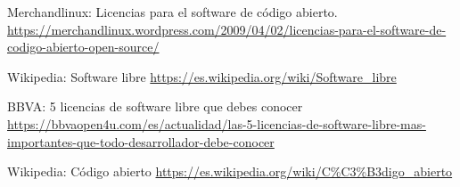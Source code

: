 \documentclass[10pt]{article}
\begin{document}
\begin{thebibliography}{9}
{}

        Merchandlinux: Licencias para el software de código abierto.
\url{https://merchandlinux.wordpress.com/2009/04/02/licencias-para-el-software-de-codigo-abierto-open-source/}

        Wikipedia: Software libre
   		\url{https://es.wikipedia.org/wiki/Software_libre}
        
        BBVA: 5 licencias de software libre que debes conocer
        \url{https://bbvaopen4u.com/es/actualidad/las-5-licencias-de-software-libre-mas-importantes-que-todo-desarrollador-debe-conocer}
        
        Wikipedia: Código abierto
        \url{https://es.wikipedia.org/wiki/C%C3%B3digo\_abierto}




        
	\end{thebibliography}
  
		
\end{document}
